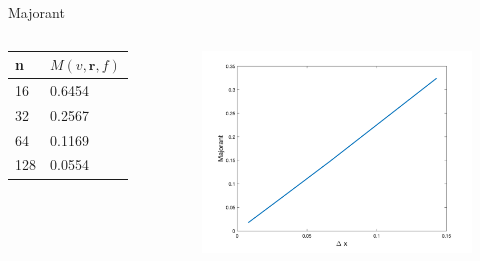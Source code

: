 \documentclass{beamer}
\begin{document}
    \begin{frame}{Majorant}
        \begin{columns}
            \begin{table}[]
                \begin{tabular}{l|l}
                \textbf{n} & $M(v, \bm{r}, f)$ \\ \hline
                16         & 0.6454            \\
                32         & 0.2567            \\
                64         & 0.1169            \\
                128        & 0.0554           
                \end{tabular}
                \end{table}
            \begin{figure}
                \includegraphics[scale=0.2]{majorant.png}
            \end{figure}
        \end{columns}
    \end{frame}
\end{document}
